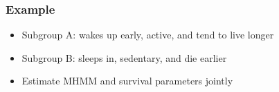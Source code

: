 \documentclass{beamer}
\begin{document}


\begin{frame}
\frametitle{Example}
\begin{itemize}
    \item Subgroup A: wakes up early, active, and tend to live longer
    \item Subgroup B: sleeps in, sedentary, and die earlier
    \item Estimate MHMM and survival parameters jointly 
\end{itemize}
\end{frame}

\end{document}
